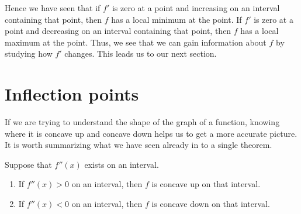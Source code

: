 \documentclass{ximera}
\begin{document}
\begin{example}
\begin{explanation}
\begin{image}
\end{image}
\end{explanation}
\end{example}


Hence we have seen that if $f'$ is zero at a point and increasing on an interval containing that  point,
then $f$ has a local minimum at the point. If $f'$ is zero at a point and
decreasing on an interval containing that point, then $f$ has a local maximum at the
point. Thus, we see that we can gain information about $f$ by
studying how $f'$ changes. This leads us to our next section.








\section{Inflection points}


If we are trying to understand the shape of the graph of a function,
knowing where it is concave up and concave down helps us to get a more
accurate picture. It is worth summarizing what we have seen already in
to a single theorem.

\begin{theorem}
Suppose that $f''(x)$ exists on an interval.
\begin{enumerate}
\item If $f''(x)>0$ on an interval, then $f$ is concave up on that interval.
\item If $f''(x)<0$ on an interval, then $f$ is concave down on that interval.
\end{enumerate}
\end{theorem}
\end{document}
